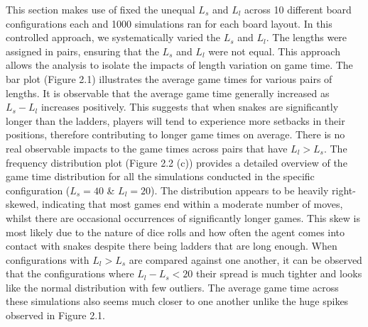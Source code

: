 \documentclass[12pt]{report}
\begin{document}
	This section makes use of fixed the unequal $L_{s}$ and $L_{l}$ across 10 different board configurations each and 1000 simulations ran for each board layout. In this controlled approach, we systematically varied the $L_{s}$ and $L_{l}$. The lengths were assigned in pairs, ensuring that the $L_{s}$ and $L_{l}$ were not equal. This approach allows the analysis to isolate the impacts of length variation on game time. The bar plot (Figure 2.1) illustrates the average game times for various pairs of lengths. It is observable that the average game time generally increased as $L_s - L_l$ increases positively. This suggests that when snakes are significantly longer than the ladders, players will tend to experience more setbacks in their positions, therefore contributing to longer game times on average. There is no real observable impacts to the game times across pairs that have $L_l > L_s$. The frequency distribution plot (Figure 2.2 (c)) provides a detailed overview of the game time distribution for all the simulations conducted in the specific configuration ($L_s=40$ \& $L_l=20$). The distribution appears to be heavily right-skewed, indicating that most games end within a moderate number of moves, whilst there are occasional occurrences of significantly longer games. This skew is most likely due to the nature of dice rolls and how often the agent comes into contact with snakes despite there being ladders that are long enough. When configurations with $L_l > L_s$ are compared against one another, it can be observed that the configurations where $L_l - L_s < 20$ their spread is much tighter and looks like the normal distribution with few outliers. The average game time across these simulations also seems much closer to one another unlike the huge spikes observed in Figure 2.1.
\end{document}
